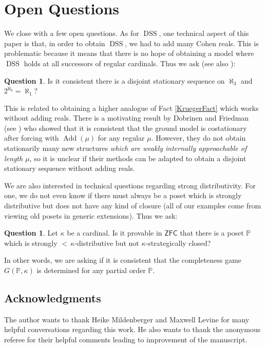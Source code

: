 \documentclass[12pt]{amsart}
\theoremstyle{definition}
\newtheorem{myque}[mydef]{Question}
\theoremstyle{remark}
\theoremstyle{plain}
\numberwithin{mydef}{section}
\DeclareMathOperator{\Add}{Add}
\DeclareMathOperator{\DSS}{DSS}
\newcommand{\dP}{\mathbb{P}}
\newcommand{\ZFC}{\mathsf{ZFC}}
\begin{document}
	\section{Open Questions}
	
	We close with a few open questions. As for $\DSS$, one technical aspect of this paper is that, in order to obtain $\DSS$, we had to add many Cohen reals. This is problematic because it means that there is no hope of obtaining a model where $\DSS$ holds at all successors of regular cardinals. Thus we ask (see also \cite[Question 12.3]{KruegerApplicMSI}):
	
	\begin{myque}
		Is it consistent there is a disjoint stationary sequence on $\aleph_3$ and $2^{\aleph_0}=\aleph_1$?
	\end{myque}
	
	This is related to obtaining a higher analogue of Fact \ref{KruegerFact} which works without adding reals. There is a motivating result by Dobrinen and Friedman (see \cite{DobrinenFriedmanCoStat}) who showed that it is consistent that the ground model is costationary after forcing with $\Add(\mu)$ for any regular $\mu$. However, they do not obtain stationarily many new structures \emph{which are weakly internally approachable of length $\mu$}, so it is unclear if their methods can be adapted to obtain a disjoint stationary sequence without adding reals.
	
	We are also interested in technical questions regarding strong distributivity. For one, we do not even know if there must always be a poset which is strongly distributive but does not have any kind of closure (all of our examples come from viewing old posets in generic extensions). Thus we ask:
	
	\begin{myque}
		Let $\kappa$ be a cardinal. Is it provable in $\ZFC$ that there is a poset $\dP$ which is strongly ${<}\,\kappa$-distributive but not $\kappa$-strategically closed?
	\end{myque}
	
	In other words, we are asking if it is consistent that the completeness game $G(\dP,\kappa)$ is determined for any partial order $\dP$.
	
	\subsection*{Acknowledgments}
	
	The author wants to thank Heike Mildenberger and Maxwell Levine for many helpful conversations regarding this work. He also wants to thank the anonymous referee for their helpful comments leading to improvement of the manuscript.
	
\end{document}
